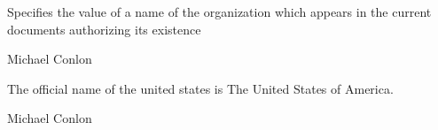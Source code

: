 \documentclass[letterpaper,10pt,english]{sphinxmanual}
\begin{document}
\begin{sphinxShadowBox}

\sphinxAtStartPar
{}
\end{sphinxShadowBox}

\begin{sphinxShadowBox}

\sphinxAtStartPar
Specifies the value of a name of the organization which appears in the current documents authorizing its existence
\end{sphinxShadowBox}

\begin{sphinxShadowBox}

\sphinxAtStartPar
Michael Conlon 
\end{sphinxShadowBox}

\begin{sphinxShadowBox}

\sphinxAtStartPar
{\hyperref[\detokenize{doc-ORG_0000001::doc}]{}}
\end{sphinxShadowBox}

\begin{sphinxShadowBox}

\sphinxAtStartPar
{}
\end{sphinxShadowBox}

\begin{sphinxShadowBox}

\sphinxAtStartPar
The official name of the united states is The United States of America.
\end{sphinxShadowBox}

\begin{sphinxShadowBox}

\sphinxAtStartPar
Michael Conlon 
\end{sphinxShadowBox}
\begin{quote}

\ignorespaces \end{quote}
\end{document}
